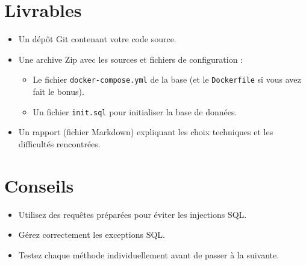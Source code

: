 \documentclass[11pt]{article}
\begin{document}
\section{Livrables}
\begin{itemize}
    \item Un dépôt Git contenant votre code source.
    \item Une archive Zip avec les sources et fichiers de configuration :
    \begin{itemize}
		    \item Le fichier \texttt{docker-compose.yml} de la base (et le \texttt{Dockerfile} si vous avez fait le bonus).
		    \item Un fichier \texttt{init.sql} pour initialiser la base de données.    
    \end{itemize}

    \item Un rapport (fichier Markdown) expliquant les choix techniques et les difficultés rencontrées.

\end{itemize}

\section{Conseils}
\begin{itemize}
    \item Utilisez des requêtes préparées pour éviter les injections SQL.
    \item Gérez correctement les exceptions SQL.
    \item Testez chaque méthode individuellement avant de passer à la suivante.
\end{itemize}
\end{document}
